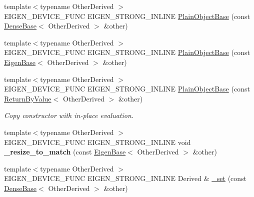 \begin{DoxyCompactItemize}
\item 
{\footnotesize template$<$typename Other\+Derived $>$ }\\E\+I\+G\+E\+N\+\_\+\+D\+E\+V\+I\+C\+E\+\_\+\+F\+U\+NC E\+I\+G\+E\+N\+\_\+\+S\+T\+R\+O\+N\+G\+\_\+\+I\+N\+L\+I\+NE \hyperlink{class_eigen_1_1_plain_object_base_a82cdb1b9d5c90c2002cb5086c03c29fa}{Plain\+Object\+Base} (const \hyperlink{group___core___module_class_eigen_1_1_dense_base}{Dense\+Base}$<$ Other\+Derived $>$ \&other)
\item 
{\footnotesize template$<$typename Other\+Derived $>$ }\\E\+I\+G\+E\+N\+\_\+\+D\+E\+V\+I\+C\+E\+\_\+\+F\+U\+NC E\+I\+G\+E\+N\+\_\+\+S\+T\+R\+O\+N\+G\+\_\+\+I\+N\+L\+I\+NE \hyperlink{class_eigen_1_1_plain_object_base_a31d65efdbeaf9c7693bf6ae204d788f2}{Plain\+Object\+Base} (const \hyperlink{group___core___module_struct_eigen_1_1_eigen_base}{Eigen\+Base}$<$ Other\+Derived $>$ \&other)
\item 
\mbox{\label{class_eigen_1_1_plain_object_base_abb80b2ee27de8b5d7ef2c8fb403c0068}} 
{\footnotesize template$<$typename Other\+Derived $>$ }\\E\+I\+G\+E\+N\+\_\+\+D\+E\+V\+I\+C\+E\+\_\+\+F\+U\+NC E\+I\+G\+E\+N\+\_\+\+S\+T\+R\+O\+N\+G\+\_\+\+I\+N\+L\+I\+NE \hyperlink{class_eigen_1_1_plain_object_base_abb80b2ee27de8b5d7ef2c8fb403c0068}{Plain\+Object\+Base} (const \hyperlink{group___core___module_class_eigen_1_1_return_by_value}{Return\+By\+Value}$<$ Other\+Derived $>$ \&other)
\begin{DoxyCompactList}\small\item\em Copy constructor with in-\/place evaluation. \end{DoxyCompactList}\item 
\mbox{\label{class_eigen_1_1_plain_object_base_ac61a071ebfe1068ff76095b617a35e93}} 
{\footnotesize template$<$typename Other\+Derived $>$ }\\E\+I\+G\+E\+N\+\_\+\+D\+E\+V\+I\+C\+E\+\_\+\+F\+U\+NC E\+I\+G\+E\+N\+\_\+\+S\+T\+R\+O\+N\+G\+\_\+\+I\+N\+L\+I\+NE void {\bfseries \+\_\+resize\+\_\+to\+\_\+match} (const \hyperlink{group___core___module_struct_eigen_1_1_eigen_base}{Eigen\+Base}$<$ Other\+Derived $>$ \&other)
\item 
{\footnotesize template$<$typename Other\+Derived $>$ }\\E\+I\+G\+E\+N\+\_\+\+D\+E\+V\+I\+C\+E\+\_\+\+F\+U\+NC E\+I\+G\+E\+N\+\_\+\+S\+T\+R\+O\+N\+G\+\_\+\+I\+N\+L\+I\+NE Derived \& \hyperlink{class_eigen_1_1_plain_object_base_aa77dab5e9e6ba9e39740e17cfae78a33}{\+\_\+set} (const \hyperlink{group___core___module_class_eigen_1_1_dense_base}{Dense\+Base}$<$ Other\+Derived $>$ \&other)

\end{DoxyCompactItemize}
